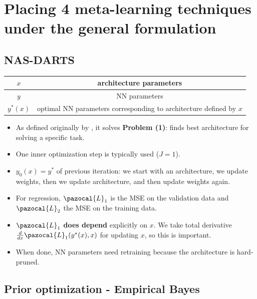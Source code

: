 \section{Placing 4 meta-learning techniques under the general formulation}
\subsection{NAS-DARTS}

\begin{center}
	\begin{tabular}{ | c || c |} 
		\hline
		$x$ & architecture parameters \\
		\hline
		$y$ & NN parameters \\
		\hline
		$y^*(x)$ & optimal NN parameters corresponding to architecture defined by $x$ \\
		\hline
	\end{tabular}
\end{center}
\begin{itemize}
	\item As defined originally by \textcite{liu2019darts}, it solves \textbf{Problem (1)}: finds best architecture for solving a specific task.
	\item One inner optimization step is typically used ($J = 1$).
	\item $y_0(x) = y^*$ of previous iteration: we start with an architecture, we update weights, then we update architecture, and then update weights again.
	\item For regression, $\pazocal{L}_1$ is the MSE on the validation data and $\pazocal{L}_2$ the MSE on the training data.
	\item $\pazocal{L}_1$ \textbf{does depend} explicitly on $x$.
	We take total derivative $\frac{d}{dx}\pazocal{L}_1(y^*(x), x)$ for updating $x$, so this is important.
	\item When done, NN parameters need retraining because the architecture is hard-pruned.
\end{itemize}

\subsection{Prior optimization - Empirical Bayes}

